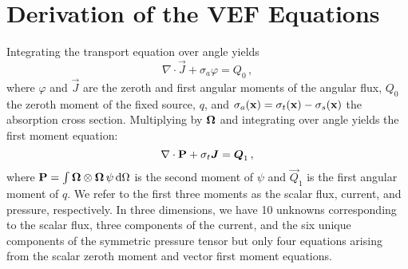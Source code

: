 \documentclass[../doc.tex]{subfiles}
\begin{document}
\section{Derivation of the VEF Equations}
Integrating the transport equation over angle yields 
	\begin{equation}
		\nabla\cdot\vec{J} + \sigma_a \varphi = Q_0 \,, 
	\end{equation}
where $\varphi$ and $\vec{J}$ are the zeroth and first angular moments of the angular flux, $Q_0$ the zeroth moment of the fixed source, $q$, and $\sigma_a(\x) = \sigma_t(\x) - \sigma_s(\x)$ the absorption cross section. Multiplying by $\Omegahat$ and integrating over angle yields the first moment equation: 
	\begin{equation}
		\nabla\cdot\P + \sigma_t \vec{J} = \vec{Q}_1 \,, 
	\end{equation}
where $\P = \int \Omegahat\otimes\Omegahat\,\psi \ud \Omega$ is the second moment of $\psi$ and $\vec{Q}_1$ is the first angular moment of $q$. We refer to the first three moments as the scalar flux, current, and pressure, respectively. In three dimensions, we have 10 unknowns corresponding to the scalar flux, three components of the current, and the six unique components of the symmetric pressure tensor but only four equations arising from the scalar zeroth moment and vector first moment equations. 
\end{document}
